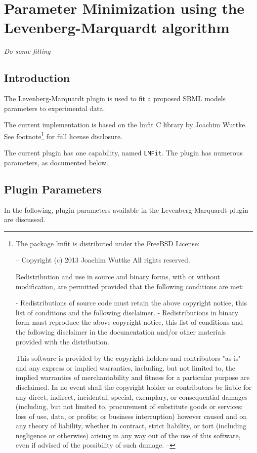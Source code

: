 \chapter{Parameter Minimization using the Levenberg-Marquardt algorithm}
\emph{Do some fitting}
\section{Introduction}
The Levenberg-Marquardt plugin is used to fit a proposed SBML models parameters to experimental data. 

The current implementation is based on the lmfit C library by Joachim Wuttke. See footnote\footnote{The package lmfit is distributed under the FreeBSD License:

--
  Copyright (c) 2013 Joachim Wuttke All rights reserved.

  Redistribution and use in source and binary forms, with or without
  modification, are permitted provided that the following conditions are met:

  - Redistributions of source code must retain the above copyright notice,
    this list of conditions and the following disclaimer.
  - Redistributions in binary form must reproduce the above copyright notice,
    this list of conditions and the following disclaimer in the documentation
    and/or other materials provided with the distribution.

  This software is provided by the copyright holders and contributors "as is"
  and any express or implied warranties, including, but not limited to, the
  implied warranties of merchantability and fitness for a particular purpose
  are disclaimed. In no event shall the copyright holder or contributors
  be liable for any direct, indirect, incidental, special, exemplary, or
  consequential damages (including, but not limited to, procurement of
  substitute goods or services; loss of use, data, or profits; or business
  interruption) however caused and on any theory of liability, whether in
  contract, strict liability, or tort (including negligence or otherwise)
  arising in any way out of the use of this software, even if advised of the
  possibility of such damage.
--} for full license disclosure.

The current plugin has one capability, named \verb|LMFit|. The plugin has numerous parameters, as documented below.

\section{Plugin Parameters}
In the following, plugin parameters available in the Levenberg-Marquardt plugin are discussed.

